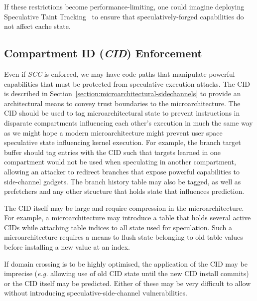 If these restrictions become performance-limiting, one could imagine deploying Speculative Taint Tracking~\cite{yu2019speculative} to ensure that speculatively-forged capabilities do not affect cache state.

\subsection{Compartment ID (\emph{CID}) Enforcement}
Even if \emph{SCC} is enforced, we may have code paths that manipulate powerful capabilities that must be protected from speculative execution attacks.
The CID is described in Section~\ref{section:microarchitectural-sidechannels} to provide an architectural means to convey trust boundaries to the microarchitecture.
The CID should be used to tag microarchitectural state to prevent instructions in disparate compartments influencing each other's execution in much the same way as we might hope a modern microarchitecture might prevent user space speculative state influencing kernel execution.
For example, the branch target buffer should tag entries with the CID such that targets learned in one compartment would not be used when speculating in another compartment, allowing an attacker to redirect branches that expose powerful capabilities to side-channel gadgets.
The branch history table may also be tagged, as well as prefetchers and any other structure that holds state that influences prediction.

The CID itself may be large and require compression in the microarchitecture.
For example, a microarchitecture may introduce a table that holds several active CIDs while attaching table indices to all state used for speculation.
Such a microarchitecture requires a means to flush state belonging to old table values before installing a new value at an index.

If domain crossing is to be highly optimised, the application of the CID may be imprecise (\textit{e.g.} allowing use of old CID state until the new CID install commits) or the CID itself may be predicted.
Either of these may be very difficult to allow without introducing speculative-side-channel vulnerabilities.
